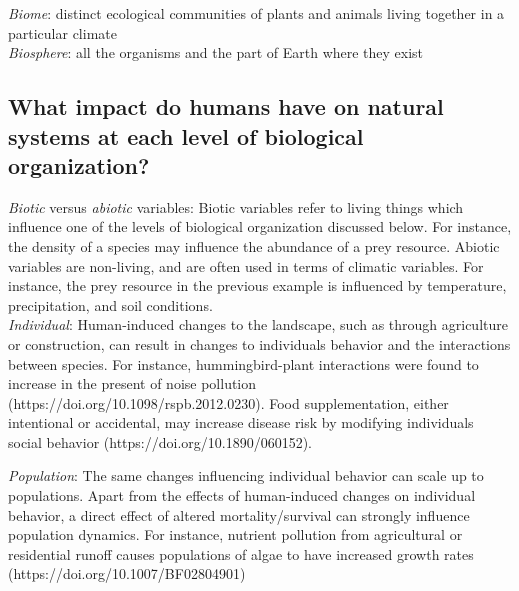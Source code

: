 \documentclass[12pt]{article}
\begin{document}
\textit{Biome}: distinct ecological communities of plants and animals living together in a particular climate \\



\textit{Biosphere}: all the organisms and the part of Earth where they exist \\







% 
%
% 
% 
%





%
%
%
%









\subsection*{What impact do humans have on natural systems at each level of biological organization?}

\textit{Biotic} versus \textit{abiotic} variables: Biotic variables refer to living things which influence one of the levels of biological organization discussed below. For instance, the density of a species may influence the abundance of a prey resource. Abiotic variables are non-living, and are often used in terms of climatic variables. For instance, the prey resource in the previous example is influenced by temperature, precipitation, and soil conditions. \\




\textit{Individual}:
Human-induced changes to the landscape, such as through agriculture or construction, can result in changes to individuals behavior and the interactions between species. For instance, hummingbird-plant interactions were found to increase in the present of noise pollution (https://doi.org/10.1098/rspb.2012.0230). Food supplementation, either intentional or accidental, may increase disease risk by modifying individuals social behavior (https://doi.org/10.1890/060152). 


\bigskip


\textit{Population}:
The same changes influencing individual behavior can scale up to populations. Apart from the effects of human-induced changes on individual behavior, a direct effect of altered mortality/survival can strongly influence population dynamics. For instance, nutrient pollution from agricultural or residential runoff causes populations of algae to have increased growth rates (https://doi.org/10.1007/BF02804901)
\end{document}
